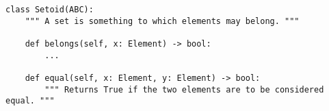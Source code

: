 \begin{verbatim}
class Setoid(ABC):
    """ A set is something to which elements may belong. """

    def belongs(self, x: Element) -> bool:
        ...

    def equal(self, x: Element, y: Element) -> bool:
        """ Returns True if the two elements are to be considered equal. """
\end{verbatim}